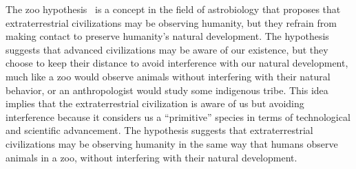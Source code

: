 The zoo hypothesis~\cite{Ball1973347} is a concept in the field of astrobiology that
proposes that extraterrestrial civilizations may be observing humanity, but they refrain from making contact
to preserve humanity's natural development.
The hypothesis suggests that advanced civilizations may be aware of our existence,
but they choose to keep their distance to avoid interference with our natural development,
much like a zoo would observe animals without interfering with their natural behavior,
or an anthropologist would study some indigenous tribe.
This idea implies that the extraterrestrial civilization is aware of us but avoiding interference because it considers us a ``primitive'' species in terms of technological and scientific advancement. The hypothesis suggests that extraterrestrial civilizations may be observing humanity in the same way that humans observe animals in a zoo, without interfering with their natural development.
